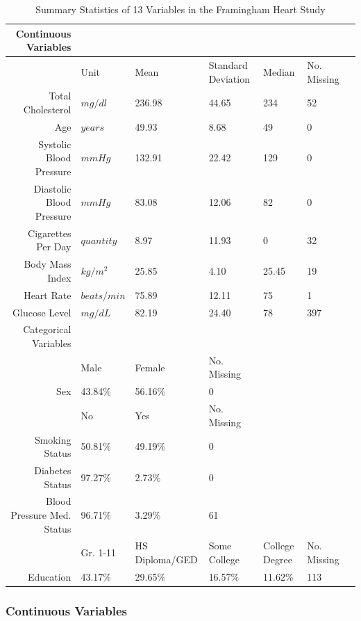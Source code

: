 \documentclass{article}\usepackage[]{graphicx}\usepackage[]{color}
\begin{document}
\begin{table}[ht]
\begin{scriptsize}
\centering
\begin{tabular}{rllllll}
  \hline
 Continuous Variables &  &  &  &  & \\ 
 \hline
    & Unit & Mean & Standard Deviation & Median & No. Missing   \\ 
   Total Cholesterol & $mg/dl$ &  236.98 & 44.65 & 234 & 52    \\ 
   Age & $years$ & 49.93 & 8.68 & 49 & 0   \\ 
   Systolic Blood Pressure & $mm Hg$ & 132.91 & 22.42 & 129 & 0   \\ 
   Diastolic Blood Pressure & $mm Hg$ & 83.08 & 12.06 & 82 & 0  \\ 
   Cigarettes Per Day & $quantity$ & 8.97 & 11.93 & 0 & 32  \\ 
  Body Mass Index & $kg/m^2$ & 25.85 & 4.10 & 25.45 & 19   \\ 
 Heart Rate & $beats/min$ & 75.89 & 12.11 & 75 & 1  \\ 
   Glucose Level & $mg/dL$ & 82.19 & 24.40 & 78 & 397   \\ 
    \hline
   Categorical Variables & & & &  & \\ 
    \hline
    & Male & Female & No. Missing & &  \\ 
   Sex & 43.84\% & 56.16\% & 0 & &\\ 
   \hline
   & No & Yes & No. Missing & &  \\ 
   Smoking Status & 50.81\% & 49.19\% & 0 & &  \\ 
   Diabetes Status & 97.27\% & 2.73\% & 0 & &  \\ 
   Blood Pressure Med. Status & 96.71\% & 3.29\% & 61 & &   \\ 
   \hline
   &  Gr. 1-11 & HS Diploma/GED &  Some College & College Degree & No. Missing \\ 
   Education & 43.17\% & 29.65\% & 16.57\% & 11.62\% & 113 \\ 
   \hline
\end{tabular}
\caption{Summary Statistics of 13 Variables in the Framingham Heart Study}
\end{scriptsize}
\end{table}

\subsubsection*{Continuous Variables}
\end{document}
